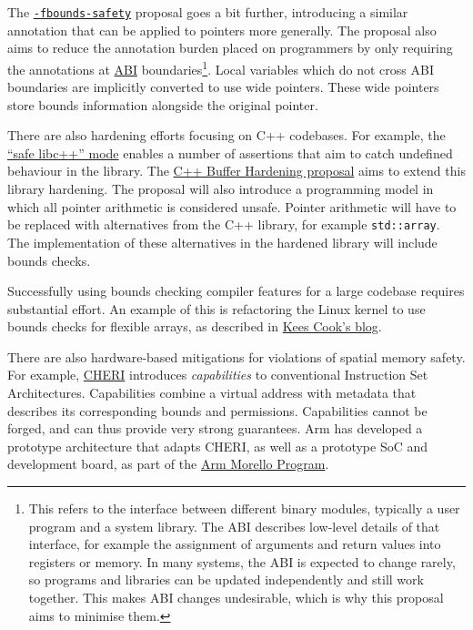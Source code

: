 \documentclass[a4paper,]{report}
\begin{document}
The
\href{https://discourse.llvm.org/t/rfc-enforcing-bounds-safety-in-c-fbounds-safety/70854}{\texttt{-fbounds-safety}}
proposal goes a bit further, introducing a similar annotation that can
be applied to pointers more generally. The proposal also aims to reduce
the annotation burden placed on programmers by only requiring the
annotations at
\href{https://en.wikipedia.org/wiki/Application_binary_interface}{ABI} boundaries\footnote{This refers to the interface
  between different binary modules, typically a user program and a
  system library. The ABI describes low-level details of that interface,
  for example the assignment of arguments and return values into
  registers or memory. In many systems, the ABI is expected to change
  rarely, so programs and libraries can be updated independently and
  still work together. This makes ABI changes undesirable, which is why
  this proposal aims to minimise them.}. Local variables which do not
cross ABI boundaries are implicitly converted to use wide pointers.
These wide pointers store bounds information alongside the original
pointer.

There are also hardening efforts focusing on C++ codebases. For example,
the
\href{https://libcxx.llvm.org/UsingLibcxx.html\#enabling-the-safe-libc-mode}{``safe
libc++'' mode} enables a number of assertions that aim to catch
undefined behaviour in the library. The
\href{https://discourse.llvm.org/t/rfc-c-buffer-hardening/65734}{C++
Buffer Hardening proposal} aims to extend this library hardening. The
proposal will also introduce a programming model in which all pointer
arithmetic is considered unsafe. Pointer arithmetic will have to be
replaced with alternatives from the C++ library, for example
\texttt{std::array}. The implementation of these alternatives in the
hardened library will include bounds checks.

Successfully using bounds checking compiler features for a large
codebase requires substantial effort. An example of this is refactoring
the Linux kernel to use bounds checks for flexible arrays, as described
in \href{\%5B@Cook2023\%5D}{Kees Cook's blog}.

There are also hardware-based mitigations for violations of spatial
memory safety. For example,
\href{https://www.cl.cam.ac.uk/research/security/ctsrd/cheri/}{CHERI}
introduces \emph{capabilities} to conventional
Instruction Set Architectures. Capabilities combine a virtual address
with metadata that describes its corresponding bounds and permissions.
Capabilities cannot be forged, and can thus provide very strong
guarantees. Arm has developed a prototype architecture that adapts
CHERI, as well as a prototype SoC and development board, as part of the
\href{https://www.arm.com/architecture/cpu/morello}{Arm Morello
Program}.
\end{document}
